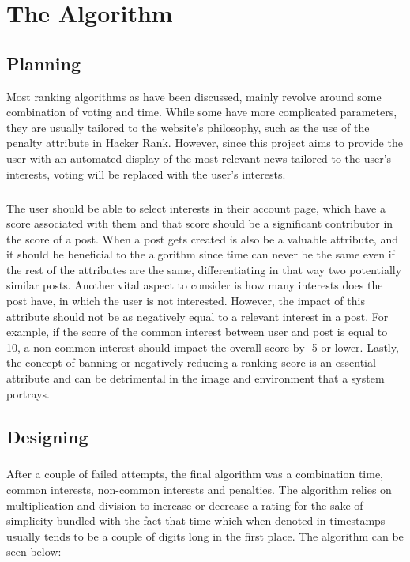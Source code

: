 \chapter {The Algorithm}

\section{Planning}

Most ranking algorithms as have been discussed, mainly revolve around some combination of voting and time. While some have more complicated parameters, they are usually tailored to the website's philosophy, such as the use of  the penalty attribute in Hacker Rank. However, since this project aims to provide the user with an automated display of the most relevant news tailored to the user's interests, voting will be replaced with the user's interests.
\paragraph{}
The user should be able to select interests in their account page, which have a score associated with them and that score should be a significant contributor in the score of a post. When a post gets created is also be a valuable attribute, and it should be beneficial to the algorithm since time can never be the same even if the rest of the attributes are the same, differentiating in that way two potentially similar posts. Another vital aspect to consider is how many interests does the post have, in which the user is not interested. However, the impact of this attribute should not be as negatively equal to a relevant interest in a post. For example, if the score of the common interest between user and post is equal to 10, a non-common interest should impact the overall score by -5 or lower. Lastly, the concept of banning or negatively reducing a ranking score is an essential attribute and can be detrimental in the image and environment that a system portrays.

\section {Designing}

\paragraph{}

After a couple of failed attempts, the final algorithm was a combination time, common interests, non-common interests and penalties. The algorithm relies on multiplication and division to increase or decrease a rating for the sake of simplicity bundled with the fact that time which when denoted in timestamps usually tends to be a couple of digits long in the first place. The algorithm can be seen below:

